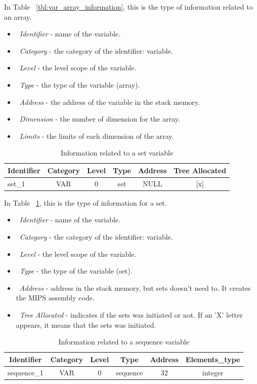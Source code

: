 \documentclass[
  oneside,
  11pt, a4paper,
  footinclude=true,
  headinclude=true,
  cleardoublepage=empty
]{scrbook}
\begin{document}
In Table ~\ref{tbl:var_array_information}, this is the type of information related to an array.
\begin{itemize}
\item ~\textit{Identifier} - name of the variable.
\item ~\textit{Category} - the category of the identifier: variable.
\item ~\textit{Level} - the level scope of the variable.
\item ~\textit{Type} - the type of the variable (array).
\item ~\textit{Address} - the address of the variable in the stack memory.
\item ~\textit{Dimension} - the number of dimension for the array.
\item ~\textit{Limits} - the limits of each dimension of the array.
\end{itemize}

\begin{table}[h!]
\centering
\caption{Information related to a set variable}
\label{tbl:var_set_information}
\begin{tabular}{l|c|c|c|c|l}
\multicolumn{1}{c|}{Identifier} & Category & Level & Type    & Address & Tree Allocated              \\ \hline
set\_1                          & VAR      & 0     & set & NULL     & \multicolumn{1}{c}{{[}x{]}}
\end{tabular}
\end{table}

In Table ~\ref{tbl:var_set_information}, this is the type of information for a set.
\begin{itemize}
\item ~\textit{Identifier} - name of the variable.
\item ~\textit{Category} - the category of the identifier: variable.
\item ~\textit{Level} - the level scope of the variable.
\item ~\textit{Type} - the type of the variable (set).
\item ~\textit{Address} - address in the stack memory, but sets doesn't need to. It creates the MIPS assembly code.
\item ~\textit{Tree Allocated} - indicates if the sets was initiated or not. If an 'X' letter appears, it means that the sets was initiated.
\end{itemize}

\begin{table}[h!]
\centering
\caption{Information related to a sequence variable}
\label{tbl:var_sequence_information}
\begin{tabular}{l|c|c|c|c|l}
\multicolumn{1}{c|}{Identifier} & Category & Level & Type     & Address & Elements\_type              \\ \hline
sequence\_1                     & VAR      & 0     & sequence & 32      & \multicolumn{1}{c}{integer}
\end{tabular}
\end{table}
\end{document}
